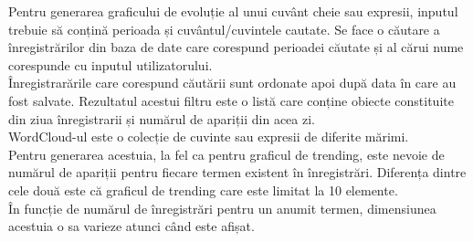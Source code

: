 Pentru generarea graficului de evoluție al unui cuvânt cheie sau expresii, inputul trebuie să conțină perioada și cuvântul/cuvintele cautate.
Se face o căutare a înregistrărilor din baza de date care corespund perioadei căutate și al cărui nume corespunde cu inputul utilizatorului.\\
Înregistrarările care corespund căutării sunt ordonate apoi după data în care au fost salvate.
Rezultatul acestui filtru este o listă care conține obiecte constituite din ziua înregistrarii și numărul de apariții din acea zi.\\

WordCloud-ul este o colecție de cuvinte sau expresii de diferite mărimi. \\
Pentru generarea acestuia, la fel ca pentru graficul de trending, este nevoie de numărul de apariții pentru fiecare termen existent
în înregistrări. Diferența dintre cele două este că graficul de trending care este limitat la 10 elemente.\\
În funcție de numărul de înregistrări pentru un anumit termen, dimensiunea acestuia o sa varieze atunci când este afișat.

